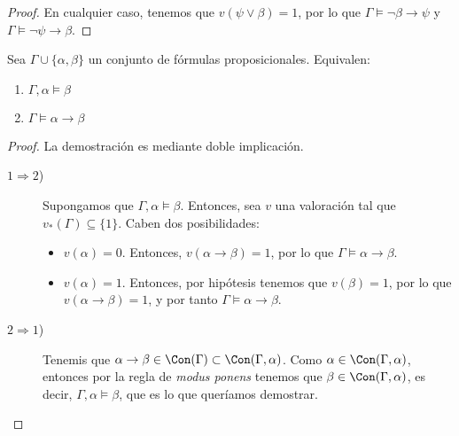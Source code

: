 \begin{ejercicio}
\begin{proof}
        En cualquier caso, tenemos que $v(\psi\lor \beta)=1$, por lo que $\Gamma \models \lnot \beta \rightarrow \psi$ y $\Gamma \models \lnot \psi \rightarrow \beta$.
    \end{proof}
\end{ejercicio}


\begin{teo}[de la Reducción]
    Sea $\Gamma\cup \{\alpha,\beta\}$ un conjunto de fórmulas proposicionales. Equivalen:
    \begin{enumerate}
        \item $\Gamma,\alpha\models \beta$
        \item $\Gamma\models \alpha\rightarrow \beta$
    \end{enumerate}
    \begin{proof}
        La demostración es mediante doble implicación.
        \begin{description}
            \item[$1\Longrightarrow 2$)] Supongamos que $\Gamma,\alpha\models \beta$.
            Entonces, sea $v$ una valoración tal que $v_\ast(\Gamma)\subseteq \{1\}$.
            Caben dos posibilidades:
            \begin{itemize}
                \item $v(\alpha)=0$. Entonces, $v(\alpha\rightarrow \beta)=1$, por lo que $\Gamma\models \alpha\rightarrow \beta$.
                \item $v(\alpha)=1$. Entonces, por hipótesis tenemos que $v(\beta)=1$, por lo que $v(\alpha\rightarrow \beta)=1$, y por tanto $\Gamma\models \alpha\rightarrow \beta$.
            \end{itemize}

            \item[$2 \Longrightarrow 1$)] 
            Tenemis que $\alpha\to \beta\in \Con(\Gamma)\subset \Con(\Gamma,\alpha)$.
            Como $\alpha\in \Con(\Gamma,\alpha)$, entonces por la regla de \emph{modus ponens} tenemos que $\beta\in \Con(\Gamma,\alpha)$, es decir, $\Gamma,\alpha\models \beta$, que es lo que queríamos demostrar.
        \end{description}
    \end{proof}
\end{teo}

